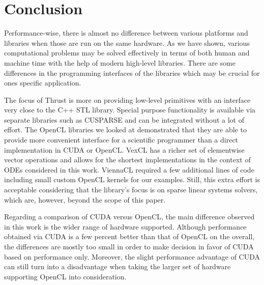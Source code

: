 \documentclass[final]{siamltex}
\begin{document}
%









%
%
\section{Conclusion}

Performance-wise, there is almost no difference between various platforms and
libraries when those are run on the same hardware. As we have shown, various
computational problems may be solved effectively in terms of both human and
machine time with the help of modern high-level libraries.  There are some
differences in the programming interfaces of the libraries which may be crucial
for ones specific application.

The focus of Thrust is more on providing low-level primitives with an interface
very close to the C++ STL library.
Special purpose functionality is available via separate libraries such as CUSPARSE
and can be integrated without a lot of effort.
The OpenCL libraries we looked at demonstrated that they are able to
provide more convenient interface for a scientific programmer than a direct
implementation in CUDA or OpenCL.
VexCL has a richer set of elementwise vector operations and allows for the
shortest implementations in the context of ODEs considered in this work.
ViennaCL required a few additional lines of code including small custom OpenCL kernels for our examples.
Still, this extra effort is acceptable considering that the library's focus is on sparse linear systems solvers,
which are, however, beyond the scope of this paper.

Regarding a comparison of CUDA versus OpenCL, the main difference observed in this work is the wider range of hardware supported.
Although performance obtained via CUDA is a few percent better than that of OpenCL on the overall,
the differences are mostly too small in order to make decision in favor of CUDA based on performance only.
Moreover, the slight performance advantage of CUDA can still turn into a disadvantage when taking the larger set of hardware supporting OpenCL into consideration.
\end{document}
